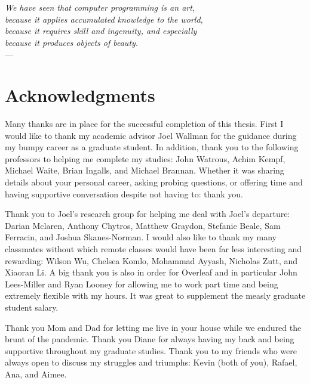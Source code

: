 
\begin{flushright}{\slshape %
        We have seen that computer programming is an art, \\
        because it applies accumulated knowledge to the world, \\
        because it requires skill and ingenuity, and especially \\
        because it produces objects of beauty.} \\ \medskip
    ---  \citep{knuth:1974}
\end{flushright}



\bigskip

\begingroup
\let\clearpage\relax
\let\cleardoublepage\relax
\let\cleardoublepage\relax

\chapter*{Acknowledgments}

Many thanks are in place for the successful completion of this thesis.
First I would like to thank my academic advisor Joel Wallman for the guidance during my bumpy career as a graduate student.
In addition, thank you to the following professors to helping me complete my studies: John Watrous, Achim Kempf, Michael Waite, Brian Ingalls, and Michael Brannan.
Whether it was sharing details about your personal career, asking probing questions, or offering time and having supportive conversation despite not having to: thank you.

Thank you to Joel's research group for helping me deal with Joel's departure: Darian Mclaren, Anthony Chytros, Matthew Graydon, Stefanie Beale, Sam Ferracin, and Joshua Skanes-Norman.
I would also like to thank my many classmates without which remote classes would have been far less interesting and rewarding: Wilson Wu, Chelsea Komlo, Mohammad Ayyash, Nicholas Zutt, and Xiaoran Li.
A big thank you is also in order for Overleaf and in particular John Lees-Miller and Ryan Looney for allowing me to work part time and being extremely flexible with my hours.
It was great to supplement the measly graduate student salary.

Thank you Mom and Dad for letting me live in your house while we endured the brunt of the pandemic.
Thank you Diane for always having my back and being supportive throughout my graduate studies.
Thank you to my friends who were always open to discuss my struggles and triumphs: Kevin (both of you), Rafael, Ana, and Aimee.

\endgroup
